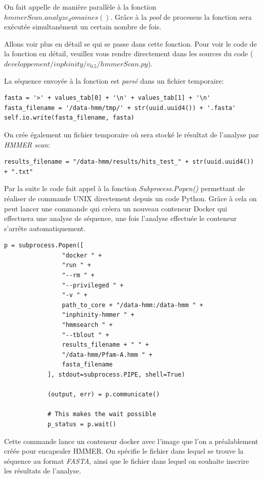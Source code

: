 On fait appelle de manière parallèle à la fonction \emph{$hmmerScan.analyze_domaines()$}. Grâce à la \emph{pool} de processus la fonction sera exécutée simultanément un certain nombre de fois.

Allons voir plus en détail se qui se passe dans cette fonction. Pour voir le code de la fonction en détail, veuillez vous rendre directement dans les sources du code (\emph{$developpement/inphinity/v_0.5/hmmerScan.py$}).

La séquence envoyée à la fonction est \emph{parsé} dans un fichier temporaire:

\begin{lstlisting}[frame=single]
fasta = '>' + values_tab[0] + '\n' + values_tab[1] + '\n'
fasta_filename = '/data-hmm/tmp/' + str(uuid.uuid4()) + '.fasta'
self.io.write(fasta_filename, fasta)
\end{lstlisting} 

On crée également un fichier temporaire où sera stocké le résultat de l'analyse par \emph{HMMER scan}:

\begin{lstlisting}[frame=single]
results_filename = "/data-hmm/results/hits_test_" + str(uuid.uuid4()) + ".txt"
\end{lstlisting} 

Par la suite le code fait appel à la fonction \emph{Subprocess.Popen()} permettant de réaliser de commande UNIX directement depuis un code Python. Grâce à cela on peut lancer une commande qui créera un nouveau conteneur Docker qui effectuera une analyse de séquence, une fois l'analyse effectuée le conteneur s'arrête automatiquement.

\begin{lstlisting}[frame=single]
p = subprocess.Popen([
                "docker " +
                "run " +
                "--rm " +
                "--privileged " +
                "-v " +
                path_to_core + "/data-hmm:/data-hmm " +
                "inphinity-hmmer " +
                "hmmsearch " +
                "--tblout " +
                results_filename + " " +
                "/data-hmm/Pfam-A.hmm " +
                fasta_filename
            ], stdout=subprocess.PIPE, shell=True)

            (output, err) = p.communicate()

            # This makes the wait possible
            p_status = p.wait()
\end{lstlisting} 

Cette commande lance un conteneur docker avec l'image que l'on a préalablement créée pour encapsuler HMMER. On spécifie le fichier dans lequel se trouve la séquence au format \emph{FASTA}, ainsi que le fichier dans lequel on souhaite inscrire les résultats de l'analyse.

